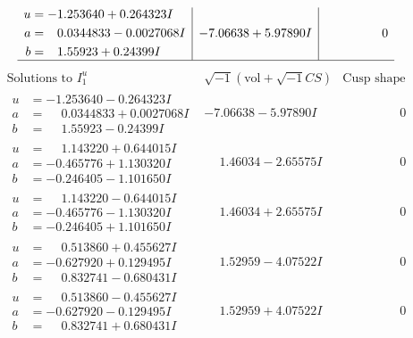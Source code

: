 \documentclass[1p]{elsarticle_modified}
\theoremstyle{definition}
\newcommand{\I}{\sqrt{-1}}
\begin{document}
$$\begin{array}{c|c|c}
\begin{aligned}
u &= -1.253640 + 0.264323 I \\
a &= \phantom{-}0.0344833 - 0.0027068 I \\
b &= \phantom{-}1.55923 + 0.24399 I\end{aligned}
 & -7.06638 + 5.97890 I & \phantom{-0.000000 } 0\\
 \hline 
 \end{array}$$\newpage$$\begin{array}{c|c|c}  
\text{Solutions to }I^u_{1}& \I (\text{vol} + \sqrt{-1}CS) & \text{Cusp shape}\\
 \hline 
\begin{aligned}
u &= -1.253640 - 0.264323 I \\
a &= \phantom{-}0.0344833 + 0.0027068 I \\
b &= \phantom{-}1.55923 - 0.24399 I\end{aligned}
 & -7.06638 - 5.97890 I & \phantom{-0.000000 } 0 \\ \hline\begin{aligned}
u &= \phantom{-}1.143220 + 0.644015 I \\
a &= -0.465776 + 1.130320 I \\
b &= -0.246405 - 1.101650 I\end{aligned}
 & \phantom{-}1.46034 - 2.65575 I & \phantom{-0.000000 } 0 \\ \hline\begin{aligned}
u &= \phantom{-}1.143220 - 0.644015 I \\
a &= -0.465776 - 1.130320 I \\
b &= -0.246405 + 1.101650 I\end{aligned}
 & \phantom{-}1.46034 + 2.65575 I & \phantom{-0.000000 } 0 \\ \hline\begin{aligned}
u &= \phantom{-}0.513860 + 0.455627 I \\
a &= -0.627920 + 0.129495 I \\
b &= \phantom{-}0.832741 - 0.680431 I\end{aligned}
 & \phantom{-}1.52959 - 4.07522 I & \phantom{-0.000000 } 0 \\ \hline\begin{aligned}
u &= \phantom{-}0.513860 - 0.455627 I \\
a &= -0.627920 - 0.129495 I \\
b &= \phantom{-}0.832741 + 0.680431 I\end{aligned}
 & \phantom{-}1.52959 + 4.07522 I & \phantom{-0.000000 } 0 \\ \hline\begin{aligned}

\end{aligned}
\end{array}$$
\end{document}
